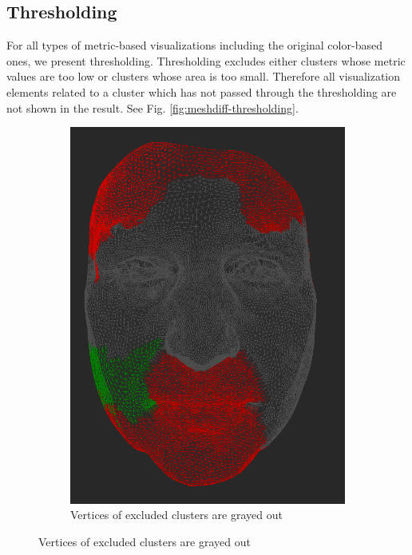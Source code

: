 \subsection{Thresholding}
\label{subsec:analysis-visualizations-thresholding}

For all types of metric-based visualizations including the original color-based ones, we present thresholding. Thresholding excludes either clusters whose metric values are too low or clusters whose area is too small. Therefore all visualization elements related to a cluster which has not passed through the thresholding are not shown in the result. See Fig. \ref{fig:meshdiff-thresholding}.

\begin{figure}[h]
\centering
	\begin{subfigure}{0.4\textwidth}
	\includegraphics[width=\textwidth]{./img/meshdiff-thresholding-clustercolor-length3.PNG}
    \caption{Vertices of excluded clusters are grayed out}

\end{subfigure}
\end{figure}
